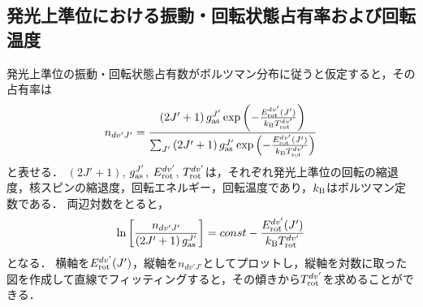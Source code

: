 \subsection{発光上準位における振動・回転状態占有率および回転温度}
発光上準位の振動・回転状態占有数がボルツマン分布に従うと仮定すると，その占有率は
\begin{equation}
    n_{dv'J'} = \frac{ \left(  2J'+1 \right) g^{J'}_{\rm as} \exp \left(-\frac{E^{dv'}_{\rm rot}(J')}{k_{\rm B} T^{dv'}_{\rm rot}} \right) }{ \sum_{J'} \left(  2J'+1 \right) g^{J'}_{\rm as} \exp \left(-\frac{E^{dv'}_{\rm rot}(J')}{k_{\rm B} T^{dv'}_{\rm rot}} \right)}
\end{equation}
と表せる．
$(2J'+1)$, $g^{J'}_{\rm as}$, $E^{dv'}_{\rm rot}$, $T^{dv'}_{\rm rot}$は，それぞれ発光上準位の回転の縮退度，核スピンの縮退度，回転エネルギー，回転温度であり，$k_{\rm B}$はボルツマン定数である．
両辺対数をとると，
\begin{equation}
    \ln \left[ \frac{n_{dv'J'}}{\left( 2J'+1 \right) g^{J'}_{\rm as}} \right]
    = const - \frac{E^{dv'}_{\rm rot}(J')}{k_{\rm B} T^{dv'}_{\rm rot}}
\end{equation}
となる．
横軸を$E^{dv'}_{\rm rot}(J')$，縦軸を$n_{dv'J'}$としてプロットし，縦軸を対数に取った図を作成して直線でフィッティングすると，その傾きから$T^{dv'}_{\rm rot}$を求めることができる．

